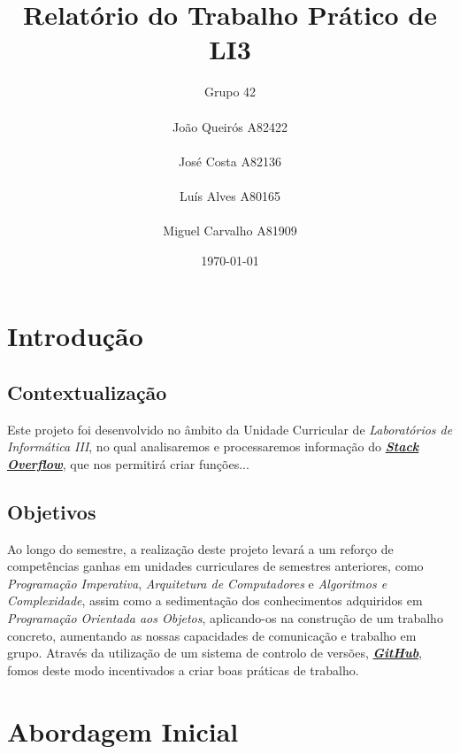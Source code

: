 \documentclass[a4paper]{report}
\begin{document}
\title{Relatório do Trabalho Prático de LI3}
\author{Grupo 42\\
\\
João Queirós A82422\\
\\
José Costa A82136\\
\\
Luís Alves A80165\\
\\
Miguel Carvalho A81909}
\date{\today}

\maketitle
\tableofcontents

\chapter{Introdução}

	\section{Contextualização}
		\tab Este projeto foi desenvolvido no âmbito da Unidade Curricular de \textit{Laboratórios de Informática III}, no qual analisaremos e processaremos informação do \href{https://pt.stackoverflow.com}{\textit{\textbf{Stack Overflow}}}, que nos permitirá criar funções...

	\section{Objetivos}
		\tab Ao longo do semestre, a realização deste projeto levará a um reforço de competências ganhas em unidades curriculares de semestres anteriores, como \textit{Programação Imperativa}, \textit{Arquitetura de Computadores} e \textit{Algoritmos e Complexidade}, assim como a sedimentação dos conhecimentos adquiridos em \textit{Programação Orientada aos Objetos}, aplicando-os na construção de um trabalho concreto, aumentando as nossas capacidades de comunicação e trabalho em grupo. Através da utilização de um sistema de controlo de versões, \href{https://github.com}{\textit{\textbf{GitHub}}}, fomos deste modo incentivados a criar boas práticas de trabalho.

\chapter{Abordagem Inicial}
\end{document}
